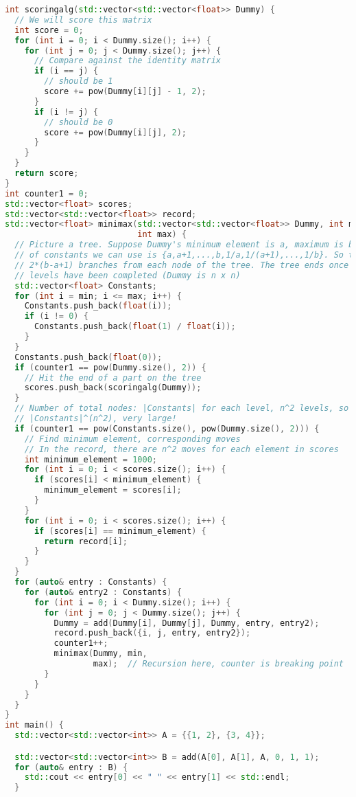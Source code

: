 \documentclass{article}
\begin{document}
\begin{lstlisting}[language=C++]
int scoringalg(std::vector<std::vector<float>> Dummy) {
  // We will score this matrix
  int score = 0;
  for (int i = 0; i < Dummy.size(); i++) {
    for (int j = 0; j < Dummy.size(); j++) {
      // Compare against the identity matrix
      if (i == j) {
        // should be 1
        score += pow(Dummy[i][j] - 1, 2);
      }
      if (i != j) {
        // should be 0
        score += pow(Dummy[i][j], 2);
      }
    }
  }
  return score;
}
int counter1 = 0;
std::vector<float> scores;
std::vector<std::vector<float>> record;
std::vector<float> minimax(std::vector<std::vector<float>> Dummy, int min,
                           int max) {
  // Picture a tree. Suppose Dummy's minimum element is a, maximum is b. The set
  // of constants we can use is {a,a+1,...,b,1/a,1/(a+1),...,1/b}. So there are
  // 2*(b-a+1) branches from each node of the tree. The tree ends once n^2
  // levels have been completed (Dummy is n x n)
  std::vector<float> Constants;
  for (int i = min; i <= max; i++) {
    Constants.push_back(float(i));
    if (i != 0) {
      Constants.push_back(float(1) / float(i));
    }
  }
  Constants.push_back(float(0));
  if (counter1 == pow(Dummy.size(), 2)) {
    // Hit the end of a part on the tree
    scores.push_back(scoringalg(Dummy));
  }
  // Number of total nodes: |Constants| for each level, n^2 levels, so
  // |Constants|^(n^2), very large!
  if (counter1 == pow(Constants.size(), pow(Dummy.size(), 2))) {
    // Find minimum element, corresponding moves
    // In the record, there are n^2 moves for each element in scores
    int minimum_element = 1000;
    for (int i = 0; i < scores.size(); i++) {
      if (scores[i] < minimum_element) {
        minimum_element = scores[i];
      }
    }
    for (int i = 0; i < scores.size(); i++) {
      if (scores[i] == minimum_element) {
        return record[i];
      }
    }
  }
  for (auto& entry : Constants) {
    for (auto& entry2 : Constants) {
      for (int i = 0; i < Dummy.size(); i++) {
        for (int j = 0; j < Dummy.size(); j++) {
          Dummy = add(Dummy[i], Dummy[j], Dummy, entry, entry2);
          record.push_back({i, j, entry, entry2});
          counter1++;
          minimax(Dummy, min,
                  max);  // Recursion here, counter is breaking point
        }
      }
    }
  }
}
int main() {
  std::vector<std::vector<int>> A = {{1, 2}, {3, 4}};

  std::vector<std::vector<int>> B = add(A[0], A[1], A, 0, 1, 1);
  for (auto& entry : B) {
    std::cout << entry[0] << " " << entry[1] << std::endl;
  }


\end{lstlisting}
\end{document}
